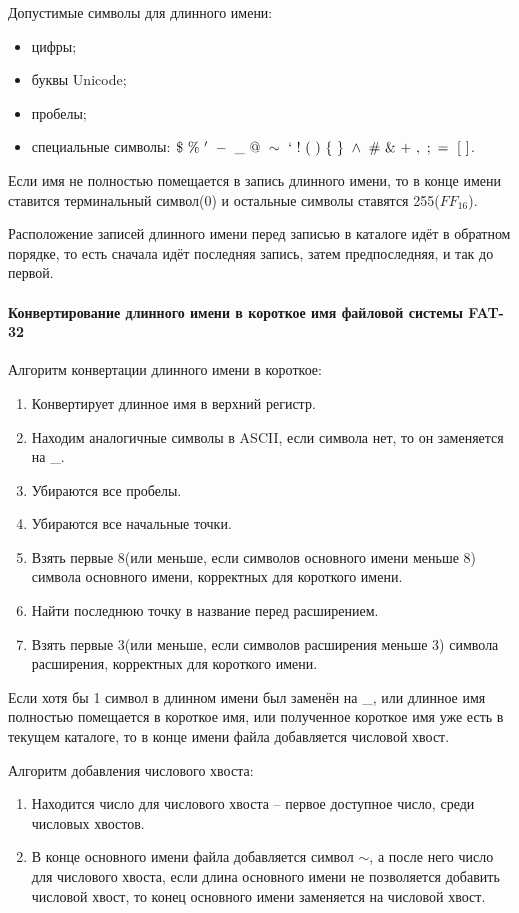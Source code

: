 Допустимые символы для длинного имени:

\begin{itemize}
\item цифры;
\item буквы Unicode;
\item пробелы;
\item специальные символы: $\$~\%~'~-~\_~@~\sim~`~!~(~)~\{~\}~\wedge~\#~\&~+~,~;~=~[~]$.
\end{itemize}

Если имя не полностью помещается в запись длинного имени, то в конце имени ставится терминальный символ(0) и остальные символы ставятся 255($FF_{16}$).

Расположение записей длинного имени перед записью в каталоге идёт в обратном порядке, то есть сначала идёт последняя запись, затем предпоследняя, и так до первой.

\paragraph{Конвертирование длинного имени в короткое имя файловой системы FAT-32}

Алгоритм конвертации длинного имени в короткое:

\begin{enumerate}
\item Конвертирует длинное имя в верхний регистр.
\item Находим аналогичные символы в ASCII, если символа нет, то он заменяется на \_.
\item Убираются все пробелы.
\item Убираются все начальные точки.
\item Взять первые 8(или меньше, если символов основного имени меньше 8) символа основного имени, корректных для короткого имени.
\item Найти последнюю точку в название перед расширением.
\item Взять первые 3(или меньше, если символов расширения меньше 3) символа расширения, корректных для короткого имени.
\end{enumerate}

Если хотя бы 1 символ в длинном имени был заменён на \_, или длинное имя полностью помещается в короткое имя, или полученное короткое имя уже есть в текущем каталоге, то в конце имени файла добавляется числовой хвост.

Алгоритм добавления числового хвоста:

\begin{enumerate}
\item Находится число для числового хвоста -- первое доступное число, среди числовых хвостов.
\item В конце основного имени файла добавляется символ $\sim$, а после него число для числового хвоста, если длина основного имени не позволяется добавить числовой хвост, то конец основного имени заменяется на числовой хвост.
\end{enumerate}

